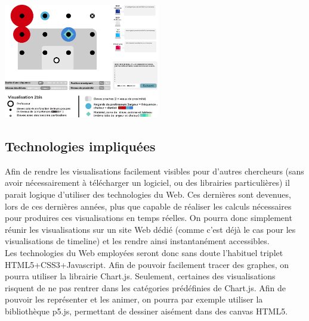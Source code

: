 \documentclass{article}
\begin{document}
\begin{itemize}
    \begin{center}
      \includegraphics[height=5cm]{visu_dessus.png}
    \end{center}
\end{itemize}

\subsection{Technologies impliquées}
Afin de rendre les visualisations facilement visibles pour d'autres chercheurs (sans avoir nécessairement à télécharger un logiciel, ou des librairies particulières) il parait logique d'utiliser des technologies du Web. Ces dernières sont devenues, lors de ces dernières années, plus que capable de réaliser les calculs nécessaires pour produires ces visualisations en temps réelles. On pourra donc simplement réunir les visualisations sur un site Web dédié (comme c'est déjà le cas pour les visualisations de timeline) et les rendre ainsi instantanément accessibles.\\
Les technologies du Web employées seront donc sans doute l'habituel triplet HTML5+CSS3+Javascript. Afin de pouvoir facilement tracer des graphes, on pourra utiliser la librairie Chart.js. Seulement, certaines des visualisations risquent de ne pas rentrer dans les catégories prédéfinies de Chart.js. Afin de pouvoir les représenter et les animer, on pourra par exemple utiliser la bibliothèque p5.js, permettant de dessiner aisément dans des canvas HTML5.

{}

\end{document}
